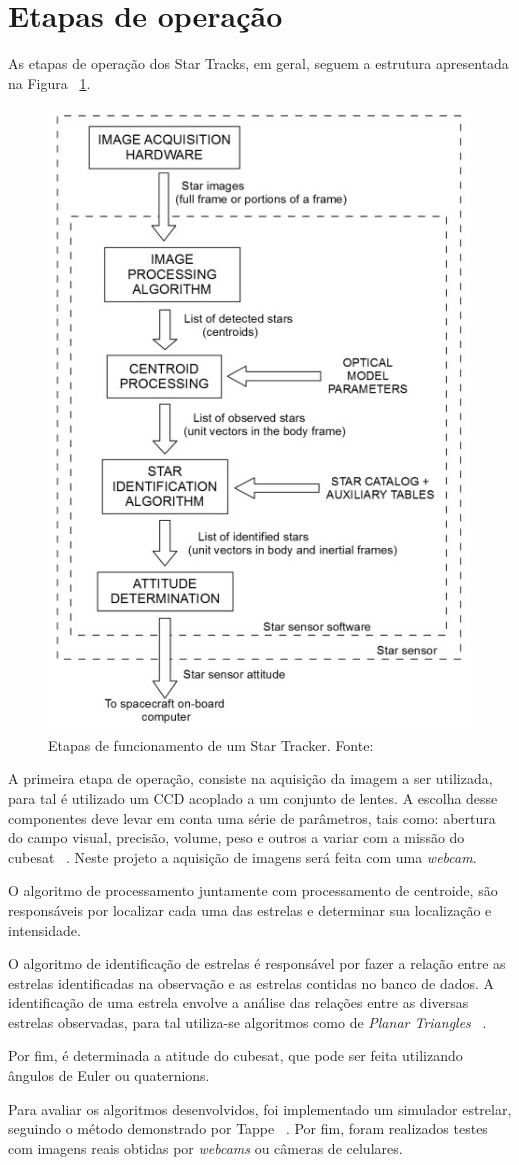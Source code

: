 \section{Etapas de operação}


As etapas de operação dos Star Tracks, em geral, seguem a estrutura apresentada na Figura ~\ref{fig:etapas_star_trackers}.


\begin{figure}[H]
	\centering
	\includegraphics[width=.6\columnwidth]{images/etapas.jpg}
	\caption{Etapas de funcionamento de um Star Tracker. Fonte: ~\cite[]{Fialho}}
	\label{fig:etapas_star_trackers}
\end{figure}

A primeira etapa de operação, consiste  na aquisição da imagem a ser utilizada, para tal é utilizado um CCD acoplado a um conjunto de lentes. A escolha desse componentes deve levar em conta uma série de parâmetros, tais como: abertura do campo visual, precisão, volume, peso e outros a variar com a  missão do cubesat ~\cite[]{Carvalho}. Neste projeto a aquisição de imagens será feita com uma \textit{webcam}.

O algoritmo de processamento juntamente com processamento de centroide, são responsáveis por localizar cada uma das estrelas e determinar sua localização e intensidade.

O algoritmo de identificação de estrelas é responsável por fazer a relação entre as estrelas identificadas na observação e as estrelas contidas no banco de dados. A identificação de uma estrela envolve a análise das relações entre as diversas estrelas observadas, para tal utiliza-se algoritmos como de  \textit{Planar Triangles} ~\cite[]{Cole}.

Por fim, é determinada a atitude do cubesat, que pode ser feita utilizando ângulos de Euler ou quaternions.

Para avaliar os algoritmos desenvolvidos, foi implementado um simulador estrelar, seguindo o método demonstrado por Tappe ~\cite[]{Tappe}. 
Por fim, foram realizados testes com imagens reais obtidas por \textit{webcams}  ou câmeras de celulares.

